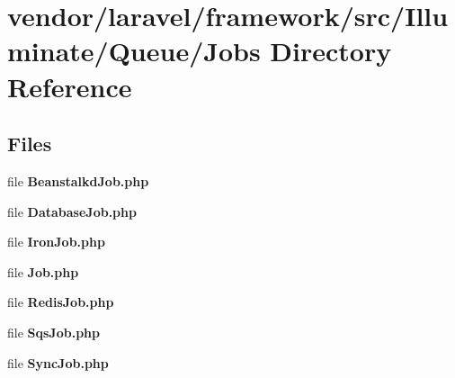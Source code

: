 \section{vendor/laravel/framework/src/\+Illuminate/\+Queue/\+Jobs Directory Reference}
\label{dir_f85ed689af5f97eb43fb71553b67fc85}
\subsection*{Files}
\begin{DoxyCompactItemize}
\item 
file {\bf Beanstalkd\+Job.\+php}
\item 
file {\bf Database\+Job.\+php}
\item 
file {\bf Iron\+Job.\+php}
\item 
file {\bf Job.\+php}
\item 
file {\bf Redis\+Job.\+php}
\item 
file {\bf Sqs\+Job.\+php}
\item 
file {\bf Sync\+Job.\+php}
\end{DoxyCompactItemize}

